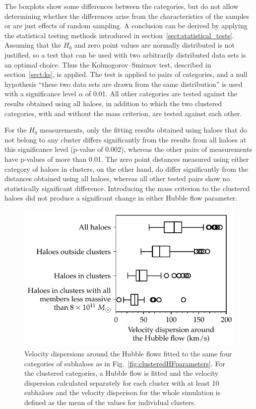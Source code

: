 \documentclass[english, oneside]{HYgradu}
\begin{document}
The boxplots show some differences between the categories, but do not allow determining whether the differences arise from the characteristics of the samples or are just effects of random sampling. A conclusion can be derived by applying the statistical testing methods introduced in section~\ref{sect:statistical_tests}. Assuming that the $H_0$ and zero point values are normally distributed is not justified, so a test that can be used with two arbitrarily distributed data sets is an optimal choice. Thus the Kolmogorov--Smirnov test, described in section~\ref{sect:ks}, is applied. The test is applied to pairs of categories, and a null hypothesis ``these two data sets are drawn from the same distribution'' is used with a significance level $\alpha$ of 0.01. All other categories are tested against the results obtained using all haloes, in addition to which the two clustered categories, with and without the mass criterion, are tested against each other.

For the $H_0$ measurements, only the fitting results obtained using haloes that do not belong to any cluster differs significantly from the results from all haloes at this significance level (p-value of 0.002), whereas the other pairs of measurements have p-values of more than 0.01. The zero point distances measured using either category of haloes in clusters, on the other hand, do differ significantly from the distances obtained using all haloes, whereas all other tested pairs show no statistically significant difference. Introducing the mass criterion to the clustered haloes did not produce a significant change in either Hubble flow parameter.

\begin{figure}
    \centering
    \includegraphics{kuvat/clusteredHFdispersions.pdf}
    \caption{Velocity dispersions around the Hubble flows fitted to the same four categories of subhaloes as in Fig.~\ref{fig:clusteredHFparameters}. For the clustered categories, a Hubble flow is fitted and the velocity dispersion calculated separately for each cluster with at least 10 subhaloes and the velocity disperison for the whole simulation is defined as the mean of the values for individual clusters.}\label{fig:clusteredHFdispersions}
\end{figure}
\end{document}
